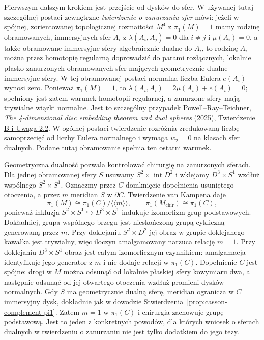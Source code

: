 Pierwszym dalszym krokiem jest przejście od dysków
do sfer. W używanej tutaj szczególnej postaci
zewnętrzne \emph{twierdzenie o zanurzaniu sfer} mówi:
jeżeli w spójnej, zorientowanej topologicznej
rozmaitości $M^4$ z $\pi_1(M)=1$ mamy rodzinę obramowanych,
immersyjnych sfer $A_i$ z
$\lambda(A_i,A_j)=0$ dla $i\ne j$ i
$\mu(A_i)=0$, a także obramowane immersyjne sfery
algebraicznie dualne do $A_i$, to rodzinę $A_i$ można
przez homotopię regularną doprowadzić do parami
rozłącznych, lokalnie płasko zanurzonych obramowanych
sfer mających geometrycznie dualne immersyjne sfery.
W tej obramowanej postaci normalna liczba Eulera
$e(A_i)$ wynosi zero. Ponieważ $\pi_1(M)=1$,
to $\lambda(A_i,A_i)=2\mu(A_i)+e(A_i)=0$;
spełniony jest zatem warunek homotopii regularnej,
a zanurzone sfery mają trywialne wiązki normalne.
Jest to szczególny
przypadek \href{https://arxiv.org/pdf/2006.05209}
{Powell--Ray--Teichner, \emph{The 4-dimensional disc
embedding theorem and dual spheres} (2025),
Twierdzenie B i Uwaga 2.2}. W ogólnej postaci twierdzenie
rozróżnia zredukowaną liczbę samoprzecięć od
liczby Eulera normalnego i wymaga $w_2=0$ na
klasach sfer dualnych. Podane tutaj obramowanie
spełnia ten ostatni warunek.

Geometryczna dualność pozwala kontrolować
chirurgię na zanurzonych sferach. Dla jednej
obramowanej sfery $S$ usuwamy
$S^2\times\operatorname{int}D^2$ i wklejamy
$D^3\times S^1$ wzdłuż wspólnego
$S^2\times S^1$. Oznaczmy przez $C$ domknięcie
dopełnienia usuniętego otoczenia, a przez $m$
meridian $S$ w $\partial C$. Twierdzenie van
Kampena daje
\[
 \pi_1(M)\cong\pi_1(C)/\langle\!\langle m\rangle\!\rangle,
 \qquad
 \pi_1(M_{\mathrm{chir}})\cong\pi_1(C),
\]
ponieważ inkluzja $S^2\times S^1\hookrightarrow
D^3\times S^1$ indukuje izomorfizm grup
podstawowych. Dokładniej, grupa wspólnego brzegu
jest nieskończoną grupą cykliczną generowaną przez $m$.
Przy doklejaniu $S^2\times D^2$ jej obraz w grupie
doklejanego kawałka jest trywialny, więc iloczyn
amalgamowany narzuca relację $m=1$. Przy doklejaniu
$D^3\times S^1$ obraz jest całym izomorficznym
czynnikiem: amalgamacja identyfikuje jego generator
z $m$ i nie dodaje relacji w $\pi_1(C)$.
Dopełnienie $C$ jest spójne: drogi w $M$ można
odsunąć od lokalnie płaskiej sfery kowymiaru dwa,
a następnie odsunąć od jej otwartego otoczenia
wzdłuż promieni dysków normalnych. Gdy $S$ ma
geometrycznie dualną sferę, meridian ogranicza
w $C$ immersyjny dysk, dokładnie jak
w dowodzie Stwierdzenia~\ref{prop:casson-complement-pi1}.
Zatem $m=1$ w $\pi_1(C)$ i chirurgia zachowuje
grupę podstawową.
Jest to jeden z konkretnych powodów, dla których
wniosek o sferach dualnych w twierdzeniu o
zanurzaniu nie jest tylko dodatkiem do jego tezy.

